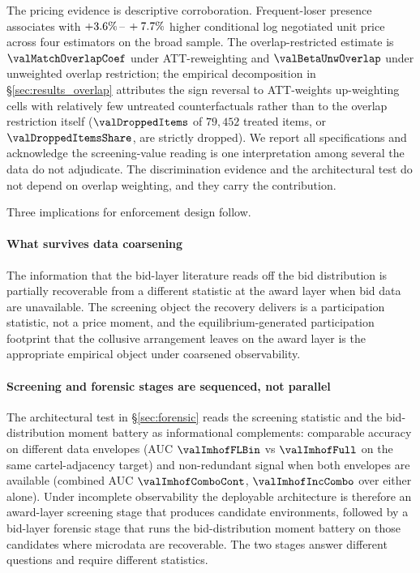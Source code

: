 The pricing evidence is descriptive corroboration. Frequent-loser
presence associates with $+3.6\%\,\text{--}\,+7.7\%$ higher conditional
log negotiated unit price across four estimators on the broad
sample. The overlap-restricted estimate is $\valMatchOverlapCoef$
under ATT-reweighting and $\valBetaUnwOverlap$ under unweighted
overlap restriction; the empirical decomposition in
\S\ref{sec:results_overlap} attributes the sign reversal to
ATT-weights up-weighting cells with relatively few untreated
counterfactuals rather than to the overlap restriction itself
($\valDroppedItems$ of $79{,}452$ treated items, or
$\valDroppedItemsShare$, are strictly dropped). We report all
specifications and acknowledge the screening-value reading is one
interpretation among several the data do not adjudicate. The
discrimination evidence and the architectural test do not depend
on overlap weighting, and they carry the contribution.

Three implications for enforcement design follow.

\paragraph{What survives data coarsening} The information that
the bid-layer literature reads off the bid distribution is
partially recoverable from a different statistic at the award
layer when bid data are unavailable. The screening object the
recovery delivers is a participation statistic, not a price
moment, and the equilibrium-generated participation footprint
that the collusive arrangement leaves on the award layer is the
appropriate empirical object under coarsened observability.

\paragraph{Screening and forensic stages are sequenced, not
parallel} The architectural test in §\ref{sec:forensic} reads
the screening statistic and the bid-distribution moment battery
as informational complements: comparable accuracy on different
data envelopes (AUC $\valImhofFLBin$ vs $\valImhofFull$ on the
same cartel-adjacency target) and non-redundant signal when
both envelopes are available (combined AUC
$\valImhofComboCont$, $\valImhofIncCombo$ over either alone). Under incomplete observability the deployable
architecture is therefore an award-layer screening stage that
produces candidate environments, followed by a bid-layer
forensic stage that runs the bid-distribution moment battery on
those candidates where microdata are recoverable. The two
stages answer different questions and require different
statistics.

